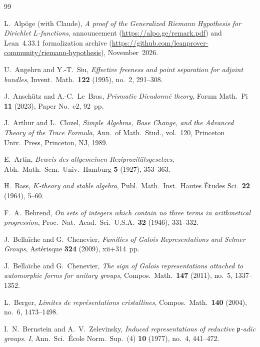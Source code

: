 \begin{thebibliography}{99}

L.~Alp\"oge (with Claude),
\emph{A proof of the Generalized Riemann Hypothesis for Dirichlet $L$-functions},
announcement (\url{https://alpo.ge/remark.pdf}) and Lean~4.33.1 formalization archive (\url{https://github.com/leanprover-community/riemann-hypothesis}), November~2026.

U.~Angehrn and Y.-T.~Siu,
\emph{Effective freeness and point separation for adjoint bundles},
Invent.\ Math.\ \textbf{122} (1995), no.~2, 291--308.

J.~Ansch\"utz and A.-C.~Le~Bras,
\emph{Prismatic Dieudonn\'e theory},
Forum Math.\ Pi \textbf{11} (2023), Paper No.~e2, 92~pp.

J.~Arthur and L.~Clozel,
\emph{Simple Algebras, Base Change, and the Advanced Theory of the Trace Formula},
Ann.\ of Math.\ Stud., vol.~120, Princeton Univ.\ Press, Princeton, NJ, 1989.

E.~Artin,
\emph{Beweis des allgemeinen Reziprozit\"atsgesetzes},
Abh.\ Math.\ Sem.\ Univ.\ Hamburg \textbf{5} (1927), 353--363.

H.~Bass,
\emph{$K$-theory and stable algebra},
Publ.\ Math.\ Inst.\ Hautes \'Etudes Sci.\ \textbf{22} (1964), 5--60.

F.~A.~Behrend,
\emph{On sets of integers which contain no three terms in arithmetical progression},
Proc.\ Nat.\ Acad.\ Sci.\ U.S.A.\ \textbf{32} (1946), 331--332.

J.~Bella\"iche and G.~Chenevier,
\emph{Families of Galois Representations and Selmer Groups},
Ast\'erisque \textbf{324} (2009), xii+314~pp.

J.~Bella\"iche and G.~Chenevier,
\emph{The sign of Galois representations attached to automorphic forms for unitary groups},
Compos.\ Math.\ \textbf{147} (2011), no.~5, 1337--1352.

L.~Berger,
\emph{Limites de repr\'esentations cristallines},
Compos.\ Math.\ \textbf{140} (2004), no.~6, 1473--1498.

I.~N.~Bernstein and A.~V.~Zelevinsky,
\emph{Induced representations of reductive $\mathfrak{p}$-adic groups. I},
Ann.\ Sci.\ \'Ecole Norm.\ Sup.\ (4) \textbf{10} (1977), no.~4, 441--472.


\end{thebibliography}
